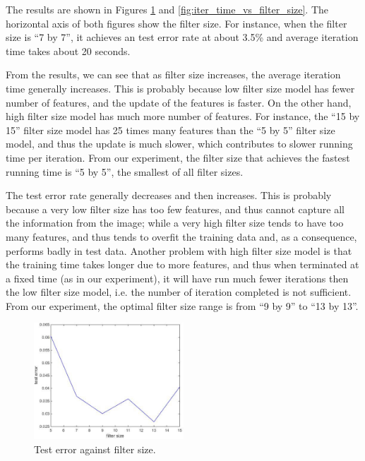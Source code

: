 \documentclass[10pt,twocolumn]{article}
\begin{document}
The results are shown in Figures \ref{fig:test_error_vs_filter_size} and \ref{fig:iter_time_vs_filter_size}. The horizontal axis of both figures show the filter size. For instance, when the filter size is ``7 by 7'', it achieves an test error rate at about 3.5\% and average iteration time takes about 20 seconds.

From the results, we can see that as filter size increases, the average iteration time generally increases. This is probably because low filter size model has fewer number of features, and the update of the features is faster. On the other hand, high filter size model has much more number of features. For instance, the ``15 by 15'' filter size model has 25 times many features than the ``5 by 5'' filter size model, and thus the update is much slower, which contributes to slower running time per iteration. From our experiment, the filter size that achieves the fastest running time is ``5 by 5'', the smallest of all filter sizes.

The test error rate generally decreases and then increases. This is probably because a very low filter size has too few features, and thus cannot capture all the information from the image; while a very high filter size tends to have too many features, and thus tends to overfit the training data and, as a consequence, performs badly in test data. Another problem with high filter size model is that the training time takes longer due to more features, and thus when terminated at a fixed time (as in our experiment), it will have run much fewer iterations then the low filter size model, i.e. the number of iteration completed is not sufficient. From our experiment, the optimal filter size range is from ``9 by 9'' to ``13 by 13''.

\begin{figure}
\includegraphics[width = 0.5\textwidth]{figure/test_error_vs_filter_size}
\caption{Test error against filter size.}
\label{fig:test_error_vs_filter_size}
\end{figure}
\end{document}

